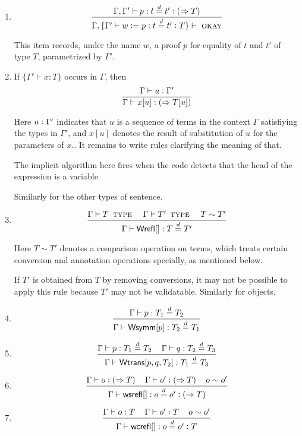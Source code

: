 \documentclass[11pt]{article}
\newcommand{\eqd}{\stackrel{d}{=}}
\newcommand{\spc}{{\,\,\,\,\,\,\,}}
\newcommand{\ccolon}[1]{\vcentcolon#1}
\newcommand{\synth}[1]{\vcentcolon(\Rightarrow#1)} %
\newcommand{\ccheck}[1]{\vcentcolon#1}  %
\newcommand{\Type}{\mathop{\text{ \sc type}}}
\newcommand{\Okay}{\mathop{\text{ \sc okay}}}
\newcommand{\ha}[2]{#1[#2]}
\newcommand{\Wrefl}{{\sf Wrefl}}
\newcommand{\Wtrans}{{\sf Wtrans}}
\newcommand{\Wsymm}{{\sf Wsymm}}
\newcommand{\wsrefl}{{\sf wsrefl}}
\newcommand{\wcrefl}{{\sf wcrefl}}
\newcommand{\defn}{\vcentcolon=}
\begin{document}
\begin{enumerate}
This item introduces an axiom asserting equality of $t$ and $t'$ under the name $w$.

\item
$$\frac{\Gamma,\Gamma'\vdash p : t \eqd t' \synth{T} }{\Gamma,\{\Gamma' \vdash w \defn p : t \eqd t' \ccolon{T} \} \vdash\Okay}$$

This item records, under the name $w$, a proof $p$ for equality of $t$ and $t'$ of type $T$, parametrized by $\Gamma'$.

\item 
If $\{ \Gamma' \vdash x : T \}$ occurs in $\Gamma$, then
$$\frac{\Gamma\vdash u \ccheck \Gamma'}{\Gamma\vdash x[u] \synth{T[u]}}$$

Here $u \ccheck \Gamma'$ indicates that $u$ is a sequence of terms in the
context $\Gamma$ satisfiying the types in $\Gamma'$, and $x[u]$ denotes the
result of substitution of $u$ for the parameters of $x$..  It remains to write
rules clarifying the meaning of that.

The implicit algorithm here fires when the code detects that the head of the
expression is a variable.

Similarly for the other types of sentence.

\item 
$$\frac{\Gamma \vdash T \Type\spc \Gamma \vdash T'\Type \spc T\sim T'}{\Gamma\vdash \ha\Wrefl{}: T\eqd T'}$$

Here $T\sim T'$ denotes a comparison operation on terms, which treats certain
conversion and annotation operations specially, as mentioned below.

If $T'$ is obtained from $T$ by removing conversions, it may not be possible to apply
this rule because $T'$ may not be validatable.  Similarly for objects.

\item 
$$\frac{\Gamma\vdash p:T_1\eqd T_2}{\Gamma\vdash \ha\Wsymm{p}:T_2\eqd T_1}$$

\item 
$$\frac{\Gamma\vdash p:T_1\eqd T_2\spc\Gamma\vdash q:T_2\eqd T_3}{\Gamma\vdash \ha\Wtrans{p,q,T_2}: T_1\eqd T_3}$$

\item 
$$\frac{\Gamma\vdash o \synth{T}\spc\Gamma\vdash o' \synth{T} \spc o \sim o'}{\Gamma\vdash \ha\wsrefl{}:o\eqd o' \synth{T}}$$

\item 
$$\frac{\Gamma\vdash o \ccheck{T}\spc\Gamma\vdash o' \ccheck{T} \spc o \sim o'}{\Gamma\vdash \ha\wcrefl{}:o\eqd o' \ccheck{T}}$$


\end{enumerate}
\end{document}
